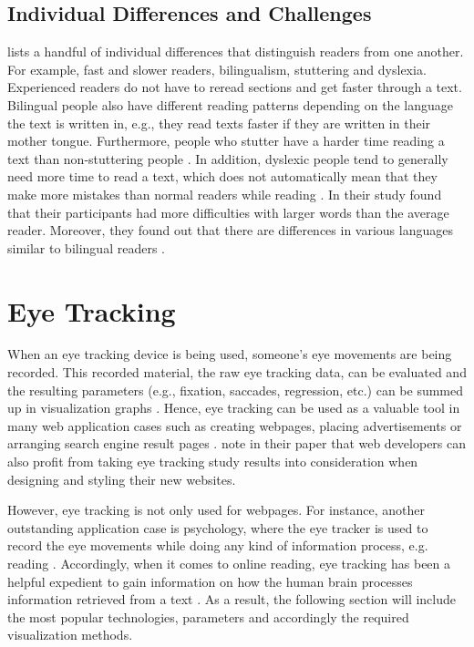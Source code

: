 \subsection{Individual Differences and Challenges}
\label{subsection:Differences}
\textcite{rayner1998eye} lists a handful of individual differences that distinguish readers from one another. For example, fast and slower readers, bilingualism, stuttering and dyslexia. Experienced readers do not have to reread sections and get faster through a text. Bilingual people also have different reading patterns depending on the language the text is written in, e.g., they read texts faster if they are written in their mother tongue. Furthermore, people who stutter have a harder time reading a text than non-stuttering people \autocite{rayner1998eye}. 
In addition, dyslexic people tend to generally need more time to read a text, which does not automatically mean that they make more mistakes than normal readers while reading \autocite{rayner1998eye, hutzler2004eye}.
In their study \textcite{hutzler2004eye} found that their participants had more difficulties with larger words than the average reader.
Moreover, they found out that there are differences in various languages similar to bilingual readers \textcite{hutzler2004eye, rayner1998eye}.

\section{Eye Tracking}
\label{section:EyeTracking}
When an eye tracking device is being used, someone's eye movements are being recorded. This recorded material, the raw eye tracking data, can be evaluated and the resulting parameters (e.g., fixation, saccades, regression, etc.) can be summed up in visualization graphs \autocite[]{goldberg2002eye, poole2006eye, beymer2007eye}. Hence, eye tracking can be used as a valuable tool in many web application cases such as creating webpages, placing advertisements or arranging search engine result pages \autocite{buscher2009you, liu2015influence}. \textcite[]{buscher2009you} note in their paper that web developers can also profit from taking eye tracking study results into consideration when designing and styling their new websites. 

However, eye tracking is not only used for webpages. For instance, another outstanding application case is psychology, where the eye tracker is used to record the eye movements while doing any kind of information process, e.g. reading \autocite{schiessl2003eye}.
Accordingly, when it comes to online reading, eye tracking has been a helpful expedient to gain information on how the human brain processes information retrieved from a text \autocite[]{schiessl2003eye}.
As a result, the following section will include the most popular technologies, parameters and accordingly the required visualization methods. 

